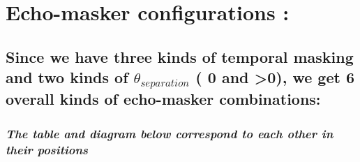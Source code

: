 \documentclass[11pt]{article}
\begin{document}
    \hypertarget{echo-masker-configurations}{%
\section{Echo-masker configurations
:}\label{echo-masker-configurations}}

\hypertarget{since-we-have-three-kinds-of-temporal-masking-and-two-kinds-of-theta_separation-0-and-0-we-get-6-overall-kinds-of-echo-masker-combinations}{%
\subsection{\texorpdfstring{Since we have three kinds of temporal
masking and two kinds of \(\theta_{separation}\) ( 0 and
\textgreater{}0), we get 6 overall kinds of echo-masker
combinations:}{Since we have three kinds of temporal masking and two kinds of \textbackslash{}theta\_\{separation\} ( 0 and \textgreater{}0), we get 6 overall kinds of echo-masker combinations:}}\label{since-we-have-three-kinds-of-temporal-masking-and-two-kinds-of-theta_separation-0-and-0-we-get-6-overall-kinds-of-echo-masker-combinations}}

\hypertarget{the-table-and-diagram-below-correspond-to-each-other-in-their-positions}{%
\subsubsection{\texorpdfstring{\emph{The table and diagram below
correspond to each other in their
positions}}{The table and diagram below correspond to each other in their positions}}\label{the-table-and-diagram-below-correspond-to-each-other-in-their-positions}}
\end{document}
